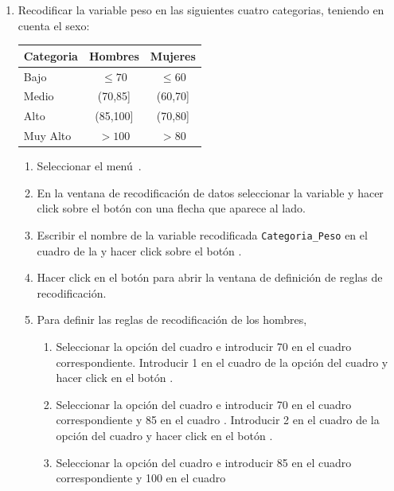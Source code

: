 \begin{enumerate}[leftmargin=*]
\begin{enumerate}
\item Recodificar la variable peso en las siguientes cuatro categorias, teniendo en cuenta el sexo:
\begin{center}
  \begin{tabular}{|l|c|c|}  
  \hline
    Categoria & Hombres & Mujeres \\
    \hline
    Bajo      &  $\leq 70$ & $\leq 60$ \\
    Medio     &  (70,85] & (60,70] \\
    Alto      &  (85,100] & (70,80] \\
    Muy Alto  &  $>100$ & $>80$ \\ 
    \hline
  \end{tabular}
\end{center}
\begin{indicacion}
\begin{enumerate}
\item Seleccionar el menú~.
\item En la ventana de recodificación de datos seleccionar la variable  y hacer click sobre el botón con una flecha que aparece al lado. 
\item Escribir el nombre de la variable recodificada \texttt{Categoria\_Peso} en el cuadro  de la  y hacer click sobre el botón . 
\item Hacer click en el botón  para abrir la ventana de definición de reglas de recodificación. 
\item Para definir las reglas de recodificación de los hombres,
\begin{enumerate}[i]
\item Seleccionar la opción  del cuadro  e introducir 70 en el cuadro
correspondiente. Introducir 1 en el cuadro de la opción  del cuadro  y hacer click en el botón
.
\item Seleccionar la opción  del cuadro  e introducir 70 en el cuadro correspondiente y 85 en el cuadro
. Introducir 2 en el cuadro de la opción  del cuadro  y hacer click en el botón
.
\item Seleccionar la opción  del cuadro  e introducir 85 en el cuadro correspondiente y 100 en el cuadro

\end{enumerate}
\end{enumerate}
\end{indicacion}
\end{enumerate}
\end{enumerate}

